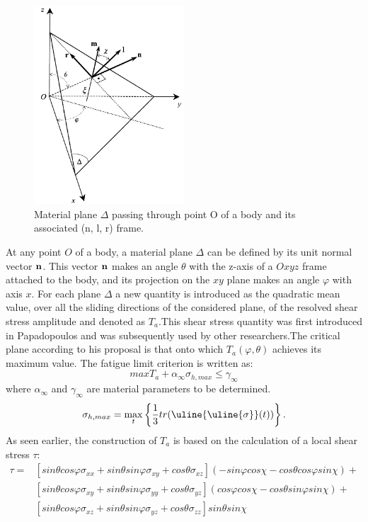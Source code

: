 \begin{figure}[h!]
	\centering
	\includegraphics[width=0.5\textwidth]{figures//demopp.png} 
	\caption{Material plane $\Delta$ passing through point O of a body and its
		associated (n, l, r) frame.}
	\label{figpapa}
\end{figure}
At any point $O$ of a body, a material plane $\Delta$ can be defined by its unit normal vector $\bf n$. This vector
$\bf n$ makes an angle $\theta$ with the z-axis of a $Oxyz$ frame attached to the body, and its projection on the $xy$ plane
makes an angle $\varphi$ with axis $x$. For each plane $\Delta$ a new quantity is introduced as the quadratic mean value, over all the sliding directions of the considered plane, of the resolved shear stress amplitude and denoted as $T_a$.This shear stress quantity was first introduced in Papadopoulos\cite{Papadopoulos1996513}
and was subsequently used by other researchers.The critical plane according to his proposal is that onto which $T_a(\varphi,\theta)$ achieves its maximum value. The fatigue limit criterion is written as:
\begin{equation}
	max T_a+\alpha_\infty \sigma_{h,max}\leqslant \gamma_\infty
	\label{eq.papa}
\end{equation}
where $\alpha_\infty$ and $\gamma_\infty$ are material parameters to be determined\cite{papadopoulos2001long}.
$$\sigma_{h,max}=\max\limits_{t}\left\lbrace \dfrac{1}{3}tr(\uline{\uline{\sigma}}(t))\right\rbrace. $$
As seen earlier, the construction of $T_a$ is based on the calculation of a local shear stress $\tau$:
\begin{equation}
	\begin{split}
		\tau=&[sin\theta cos\varphi\sigma_{xx}+sin\theta sin\varphi\sigma_{xy}+cos\theta\sigma_{xz}](-sin\varphi cos\chi-cos\theta cos\varphi sin\chi)+\\&[sin\theta cos\varphi\sigma_{xy}+sin\theta sin\varphi\sigma_{yy}+cos\theta\sigma_{yz}](cos\varphi cos\chi-cos\theta sin\varphi sin\chi)+\\&[sin\theta cos\varphi\sigma_{xz}+sin\theta sin\varphi\sigma_{yz}+cos\theta\sigma_{zz}]sin\theta sin\chi
	\end{split} 
	\label{eqres}
\end{equation}
